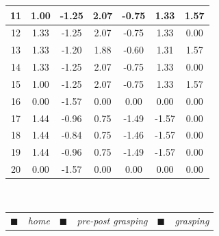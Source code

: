 \begin{table}[htp!]
\begin{tabular}{c|c|c|c|c|c|c}
		\hline 
		\rowcolor{pre-post-grasping-gray} 	11  &    1.00       &     -1.25    &     2.07     &     -0.75    &     1.33     &     1.57     \\ 
		\hline 
		\rowcolor{pre-post-grasping-gray} 	12  &    1.33       &     -1.25    &     2.07     &     -0.75    &     1.33     &     0.00     \\ 
		\hline 
		\rowcolor{grasping-gray} 		    13  &    1.33       &     -1.20    &     1.88     &     -0.60    &     1.31     &     1.57     \\ 
		\hline 
		\rowcolor{pre-post-grasping-gray} 	14  &    1.33       &     -1.25    &     2.07     &     -0.75    &     1.33     &     0.00     \\ 
		\hline
		\rowcolor{pre-post-grasping-gray} 	15  &    1.00       &     -1.25    &     2.07     &     -0.75    &     1.33     &     1.57     \\ 
		\hline
		\rowcolor{home-gray} 				16  &    0.00       &     -1.57    &     0.00     &     0.00     &     0.00     &     0.00     \\ 
		\hline
		\rowcolor{pre-post-grasping-gray} 	17  &    1.44       &     -0.96    &     0.75     &     -1.49    &     -1.57    &     0.00     \\ 
		\hline
		\rowcolor{grasping-gray} 			18  &    1.44       &     -0.84    &     0.75     &     -1.46    &     -1.57    &     0.00     \\ 
		\hline
		\rowcolor{pre-post-grasping-gray} 	19  &    1.44       &     -0.96    &     0.75     &     -1.49    &     -1.57    &     0.00     \\ 
		\hline
		\rowcolor{home-gray} 				20  &    0.00       &     -1.57    &     0.00     &      0.00    &      0.00    &     0.00     \\ 
		\hline
	\end{tabular}
	\\
	\begin{tabular}{cccccc}
		\textcolor{home-gray}{$\blacksquare$} & \textit{home} &
		\textcolor{pre-post-grasping-gray}{$\blacksquare$} & \textit{pre-post grasping} &
		\textcolor{grasping-gray}{$\blacksquare$} & \textit{grasping} \\
	\end{tabular}
\end{table}


